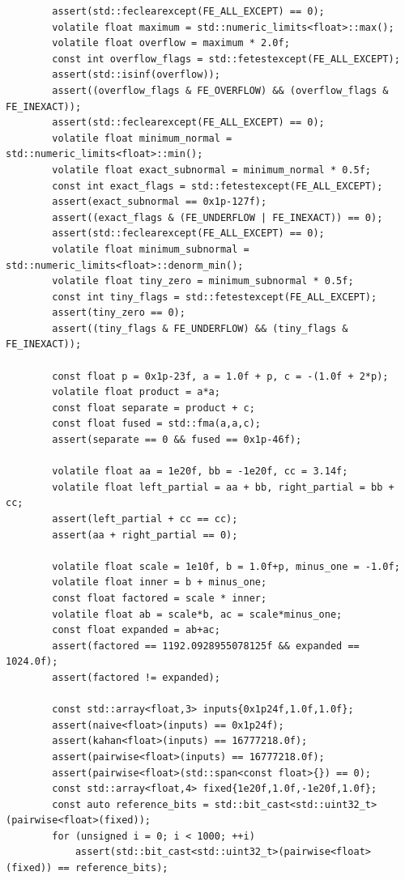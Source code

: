 \begin{verbatim}
        assert(std::feclearexcept(FE_ALL_EXCEPT) == 0);
        volatile float maximum = std::numeric_limits<float>::max();
        volatile float overflow = maximum * 2.0f;
        const int overflow_flags = std::fetestexcept(FE_ALL_EXCEPT);
        assert(std::isinf(overflow));
        assert((overflow_flags & FE_OVERFLOW) && (overflow_flags & FE_INEXACT));
        assert(std::feclearexcept(FE_ALL_EXCEPT) == 0);
        volatile float minimum_normal = std::numeric_limits<float>::min();
        volatile float exact_subnormal = minimum_normal * 0.5f;
        const int exact_flags = std::fetestexcept(FE_ALL_EXCEPT);
        assert(exact_subnormal == 0x1p-127f);
        assert((exact_flags & (FE_UNDERFLOW | FE_INEXACT)) == 0);
        assert(std::feclearexcept(FE_ALL_EXCEPT) == 0);
        volatile float minimum_subnormal = std::numeric_limits<float>::denorm_min();
        volatile float tiny_zero = minimum_subnormal * 0.5f;
        const int tiny_flags = std::fetestexcept(FE_ALL_EXCEPT);
        assert(tiny_zero == 0);
        assert((tiny_flags & FE_UNDERFLOW) && (tiny_flags & FE_INEXACT));

        const float p = 0x1p-23f, a = 1.0f + p, c = -(1.0f + 2*p);
        volatile float product = a*a;
        const float separate = product + c;
        const float fused = std::fma(a,a,c);
        assert(separate == 0 && fused == 0x1p-46f);

        volatile float aa = 1e20f, bb = -1e20f, cc = 3.14f;
        volatile float left_partial = aa + bb, right_partial = bb + cc;
        assert(left_partial + cc == cc);
        assert(aa + right_partial == 0);

        volatile float scale = 1e10f, b = 1.0f+p, minus_one = -1.0f;
        volatile float inner = b + minus_one;
        const float factored = scale * inner;
        volatile float ab = scale*b, ac = scale*minus_one;
        const float expanded = ab+ac;
        assert(factored == 1192.0928955078125f && expanded == 1024.0f);
        assert(factored != expanded);

        const std::array<float,3> inputs{0x1p24f,1.0f,1.0f};
        assert(naive<float>(inputs) == 0x1p24f);
        assert(kahan<float>(inputs) == 16777218.0f);
        assert(pairwise<float>(inputs) == 16777218.0f);
        assert(pairwise<float>(std::span<const float>{}) == 0);
        const std::array<float,4> fixed{1e20f,1.0f,-1e20f,1.0f};
        const auto reference_bits = std::bit_cast<std::uint32_t>(pairwise<float>(fixed));
        for (unsigned i = 0; i < 1000; ++i)
            assert(std::bit_cast<std::uint32_t>(pairwise<float>(fixed)) == reference_bits);


\end{verbatim}

